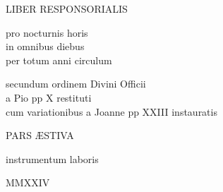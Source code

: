 \documentclass[liber-responsorialis_aestivus.tex]{subfiles}
\begin{document}
\begin{titlepage}
\begin{center}
\null\vspace{4cm}

{\Huge{}LIBER RESPONSORIALIS}

\vspace{1cm}

{\Large\sc{}pro nocturnis horis\\in omnibus diebus\\per totum anni circulum}

\vspace{5mm}

{\large\sc{}secundum ordinem Divini Officii\\a Pio pp X restituti\\cum variationibus a Joanne pp XXIII instauratis}

\vspace{5mm}

{\Large\sc{}PARS ÆSTIVA}

\vspace{3.5cm}

{\large\sc{}instrumentum laboris}

\vfill

MMXXIV

\end{center}
\end{titlepage}

\null


\end{document}
